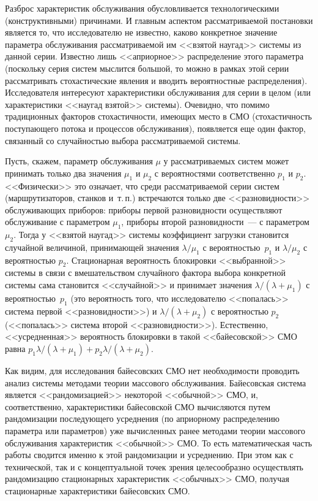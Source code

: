 \begin{multicols}{2}
Разброс характеристик обслуживания обуслов\-ли\-ва\-ет\-ся технологическими (конструктивными) причинами. И главным аспектом
рассматриваемой постановки является то, что исследователю не известно, каково конкретное значение параметра
обслуживания рассматриваемой им <<взятой наугад>> системы из данной серии. Известно лишь <<априорное>> распределение
этого параметра (поскольку серия систем мыслится большой, то можно в рамках этой серии рассматривать стохастические
явления и вводить вероятностные распределения). Исследователя интересуют характеристики обслуживания для серии в целом
(или характеристики <<наугад взятой>> системы). Очевидно, что помимо традиционных факторов стохастичности, имеющих
место в СМО (стохастичность поступающего потока и процессов обслуживания), появляется еще один фактор, связанный со
случайностью выбора рассматриваемой системы.

Пусть, скажем, параметр обслуживания $\mu$ у рассматриваемых систем может принимать только два значения $\mu_1$ и
$\mu_2$ с вероятностями соответственно $p_1$ и $p_2$. <<Физически>> это означает, что среди рассматриваемой серии
систем (маршрутизаторов, станков и~т.\,п.) встречаются только две <<разновидности>> обслуживающих приборов: приборы
первой разновидности осуществляют обслуживание с параметром $\mu_1$, приборы второй разновидности~--- с параметром
$\mu_2$. Тогда у <<взятой наугад>> системы коэффициент загрузки становится случайной величиной, принимающей значения
$\lambda/\mu_1$ с ве\-ро\-ятностью~$p_1$ и $\lambda/\mu_2$ с вероятностью $p_2$. Ста\-ци\-о\-нар\-ная вероятность блокировки
<<выбранной>> системы в связи с вмешательством случайного фактора выбора конкретной системы сама становится
<<случайной>> и принимает значения $\lambda/(\lambda+\mu_1)$ с вероятностью~$p_1$ (это вероятность того, что
исследователю <<попалась>> система первой <<разновидности>>) и $\lambda/(\lambda+\mu_2)$ с вероятностью $p_2$
(<<попалась>> система второй <<разновидности>>). Естественно, <<усредненная>> вероятность блокировки в такой
<<байесовской>> СМО равна $p_1\lambda/(\lambda+\mu_1)+p_2\lambda/(\lambda+\mu_2)$.

Как видим, для исследования байесовских СМО нет необходимости проводить анализ сис\-те\-мы %
ме\-то\-да\-ми теории массового
обслуживания. Байесов\-ская система является <<рандомизацией>> не\-ко\-торой <<обычной>> СМО, и, соответственно, %
характеристики байесовской СМО вычисляются путем рандомизации последующего усреднения (по априорному распределению
параметра или параметров) уже вычисленных ранее методами теории массового обслуживания характеристик <<обычной>> СМО.
То есть математическая часть работы сводится именно к этой рандомизации и усреднению. При этом как с технической, так и
с концептуальной точек зрения целесообразно осуществлять рандомизацию стационарных характеристик  
<<обычных>> СМО,
получая стационарные характеристики байесовских СМО.
{

}
\end{multicols}

